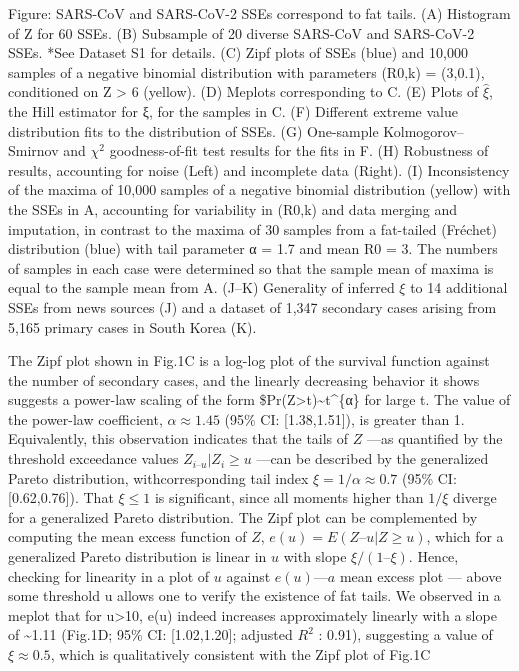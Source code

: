 \documentclass[
]{book}
\begin{document}
Figure: SARS-CoV and SARS-CoV-2 SSEs correspond to fat tails.
(A) Histogram of Z for 60 SSEs.
(B) Subsample of 20 diverse SARS-CoV and SARS-CoV-2 SSEs. *See Dataset S1 for details.
(C) Zipf plots of SSEs (blue) and 10,000 samples of a negative binomial distribution
with parameters (R0,k) = (3,0.1), conditioned on Z \textgreater{} 6 (yellow).
(D) Meplots corresponding to C.
(E) Plots of \(\hat{ξ}\), the Hill estimator for ξ, for the samples in C.
(F) Different extreme value distribution fits to the distribution of SSEs.
(G) One-sample Kolmogorov--Smirnov and \(χ^{2}\) goodness-of-fit test results for the fits in F.
(H) Robustness of results, accounting for noise (Left) and incomplete data (Right).
(I) Inconsistency of the maxima of 10,000 samples of a negative binomial distribution (yellow)
with the SSEs in A, accounting for variability in (R0,k) and data merging and imputation,
in contrast to the maxima of 30 samples from a fat-tailed (Fréchet) distribution (blue)
with tail parameter α = 1.7 and mean R0 = 3.
The numbers of samples in each case were determined so that
the sample mean of maxima is equal to the sample mean from A.
(J--K) Generality of inferred \(ξ\) to 14 additional SSEs from news sources
(J) and a dataset of 1,347 secondary cases arising from 5,165 primary cases in South Korea
(K).

The Zipf plot shown in Fig.1C is a log-log plot of the survival function against the number
of secondary cases, and the linearly decreasing behavior it shows
suggests a power-law scaling of the form \$Pr(Z\textgreater t)\textasciitilde t\^{}\{α\} for large t.
The value of the power-law coefficient, \(α≈1.45\) (95\% CI: {[}1.38,1.51{]}), is greater than 1.
Equivalently, this observation indicates that the tails of \(Z\) ---as quantified by the threshold
exceedance values \({Z_{i–u} | Z_{i} ≥u}\) ---can be described by the generalized Pareto distribution,
withcorresponding tail index \(ξ=1/α ≈ 0.7\) (95\% CI: {[}0.62,0.76{]}).
That \(ξ≤1\) is significant,
since all moments higher than \(1/ξ\) diverge for a generalized Pareto distribution.
The Zipf plot can be complemented by computing
the mean excess function of \(Z\), \(e(u) = E(Z–u | Z≥u)\), which
for a generalized Pareto distribution is linear in \(u\) with slope \(ξ/(1–ξ)\).
Hence, checking for linearity in a plot of \(u\) against \(e(u) — a\) mean excess plot --- above some threshold u allows one to verify the existence
of fat tails. We observed in a meplot that for u\textgreater10, e(u) indeed increases approximately linearly with a
slope of \textasciitilde1.11 (Fig.1D; 95\% CI: {[}1.02,1.20{]}; adjusted \(R^{2}\) : 0.91),
suggesting a value of \(ξ≈0.5\), which is
qualitatively consistent with the Zipf plot of Fig.1C
\end{document}
